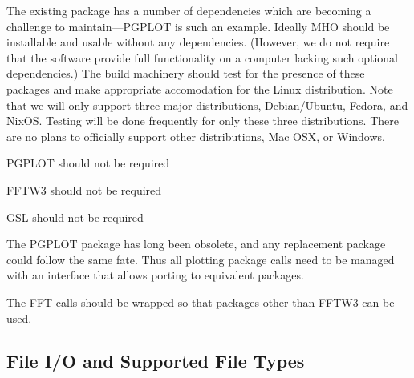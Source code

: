 The existing package has a number of dependencies which are becoming
a challenge to maintain---\acs{PGPLOT} is such an example.  Ideally
\acs{MHO} should be installable and usable without any dependencies.
(However, we do not require that the software provide full functionality
on a computer lacking such optional dependencies.)  The build machinery should test
for the presence of these packages and make appropriate accomodation for
the Linux distribution. Note that we will only support three major distributions,
Debian/Ubuntu, Fedora, and NixOS. Testing will be done frequently for only these
three distributions. There are no plans to officially support other distributions,
Mac OSX, or Windows.

\begin{description}

 \acs{PGPLOT} should not be required

 \acs{FFTW3} should not be required

 \acs{GSL} should not be required

 The \acs{PGPLOT} package has long been obsolete, and any replacement
    package could follow the same fate.  Thus all plotting package calls
    need to be managed with an interface that allows porting to equivalent
    packages.

 The \ac{FFT} calls should be wrapped so that packages other than
    \acs{FFTW3} can be used.

\end{description}






\subsection{File I/O and Supported File Types}
\label{sec:ioreq}

